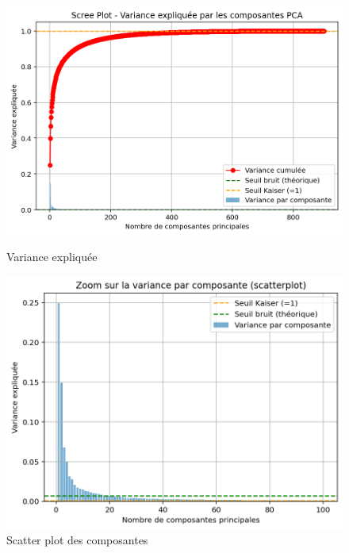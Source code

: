 \documentclass[
  12pt,
]{article}
\begin{document}
\begin{figure}[H]
    \centering
    \begin{minipage}{0.48\textwidth}
        \centering
        \includegraphics[width=\linewidth]{vis/variance_exp.png}
        \caption{Variance expliquée}
        \label{fig:variance_exp}
    \end{minipage}
    \hfill
    \begin{minipage}{0.48\textwidth}
        \centering
        \includegraphics[width=\linewidth]{vis/scatterplot_cp.png}
        \caption{Scatter plot des composantes}
        \label{fig:scatterplot_cp}
    \end{minipage}
    \label{fig:pca_results}
\end{figure}
\end{document}
